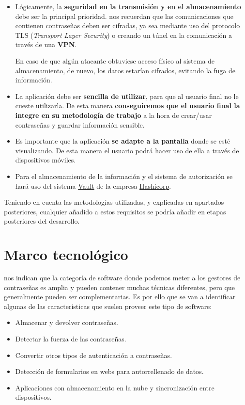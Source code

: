\documentclass{\ClassPath/viu-tfm-template}
\begin{document}
\begin{itemize}
    \item Lógicamente, la \textbf{seguridad en la transmisión y en el almacenamiento} debe ser la principal prioridad.  \textcite{scarfone2009guide} nos recuerdan que las comunicaciones que contienen contraseñas deben ser cifradas, ya sea mediante uso del protocolo TLS (\textit{Transport Layer Security}) o creando un túnel en la comunicación a través de una \textbf{VPN}.

    En caso de que algún atacante obtuviese acceso físico al sistema de almacenamiento, de nuevo, los datos estarían cifrados, evitando la fuga de información.

    \item La aplicación debe ser \textbf{sencilla de utilizar}, para que al usuario final no le cueste utilizarla. De esta manera \textbf{conseguiremos que el usuario final la integre en su metodología de trabajo} a la hora de crear/usar contraseñas y guardar información sensible.

    \item Es importante que la aplicación \textbf{se adapte a la pantalla} donde se esté visualizando. De esta manera el usuario podrá hacer uso de ella a través de dispositivos móviles.

    \item Para el almacenamiento de la información y el sistema de autorización se hará uso del sistema \href{https://www.vaultproject.io/}{Vault} de la empresa \href{https://www.hashicorp.com/}{Hashicorp}.
\end{itemize}

Teniendo en cuenta las metodologías utilizadas, y explicadas en apartados posteriores, cualquier añadido a estos requisitos se podría añadir en etapas posteriores del desarrollo.


\chapter{Marco tecnológico}

\textcite{tapas} nos indican que la categoría de software donde podemos meter a los gestores de contraseñas es amplia y pueden contener muchas técnicas diferentes, pero que generalmente pueden ser complementarias. Es por ello que se van a identificar algunas de las características que suelen proveer este tipo de software:

\begin{itemize}
    \item Almacenar y devolver contraseñas.
    \item Detectar la fuerza de las contraseñas.
    \item Convertir otros tipos de autenticación a contraseñas.
    \item Detección de formularios en webs para autorrellenado de datos.
    \item Aplicaciones con almacenamiento en la nube y sincronización entre dispositivos.
\end{itemize}
\end{document}
